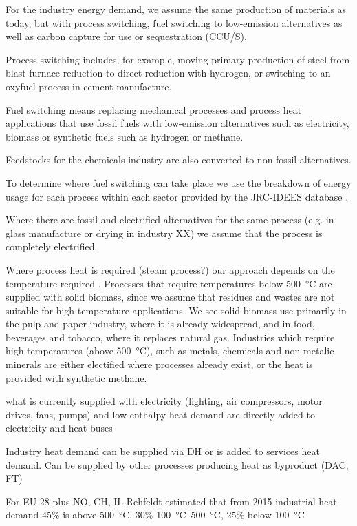 For the industry energy demand, we assume the same
production of materials as today, but with process switching, fuel switching to
low-emission alternatives as well as carbon capture for use or sequestration
(CCU/S).

Process switching includes, for example, moving primary production of
steel from blast furnace reduction to direct reduction with hydrogen, or
switching to an oxyfuel process in cement manufacture.

Fuel switching means
replacing mechanical processes and process heat applications that use fossil
fuels with low-emission alternatives such as electricity, biomass or synthetic
fuels such as hydrogen or methane.

Feedstocks for the chemicals industry are
also converted to non-fossil alternatives.

To determine where fuel switching can take place we use the breakdown of energy
usage for each process within each sector provided by the JRC-IDEES database
.

Where there are fossil and electrified alternatives for the same
process (e.g. in glass manufacture or drying in industry XX) we assume that the
process is completely electrified.

Where process heat is required (steam
process?) our approach depends on the temperature required
. Processes that require temperatures below
\SI{500}{\celsius} are supplied with solid biomass, since we assume that residues and
wastes are not suitable for high-temperature applications. We see solid biomass
use primarily in the pulp and paper industry, where it is already widespread,
and in food, beverages and tobacco, where it replaces natural gas. Industries
which require high temperatures (above \SI{500}{\celsius}), such as metals, chemicals
and non-metalic minerals are either electified where processes already exist, or
the heat is provided with synthetic methane.

what is currently supplied with electricity (lighting, air compressors, motor drives, fans, pumps)
and low-enthalpy heat demand are directly added to electricity and heat buses

Industry heat demand can be supplied via DH or is added to services heat demand.
Can be supplied by other processes producing heat as byproduct (DAC, FT)

For EU-28 plus NO, CH, IL Rehfeldt estimated that from 2015 industrial heat demand
45\% is above \SI{500}{\celsius}, 30\% \SIrange{100}{500}{\celsius}, 25\% below \SI{100}{\celsius}


